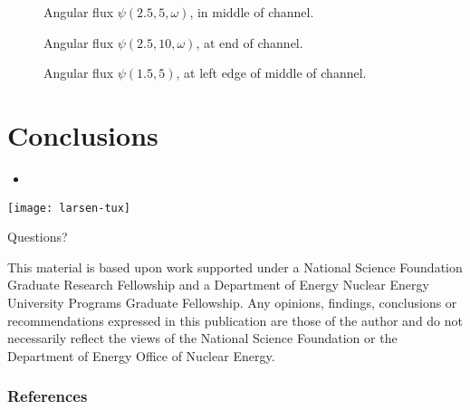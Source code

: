 \documentclass{beamer}
\begin{document}
\begin{frame}
\begin{figure}[tb]
  \centering
  
  \caption{Angular flux $\psi(2.5,5,\omega)$, in middle of channel.}
  \label{fig:psi5}
\end{figure}
\end{frame}

\begin{frame}
\begin{figure}[tb]
  \centering
  
  \caption{Angular flux $\psi(2.5,10,\omega)$, at end of channel.}
  \label{fig:psi10}
\end{figure}
\end{frame}

\begin{frame}
\begin{figure}[tb]
  \centering
  
  \caption{Angular flux $\psi(1.5,5)$, at left edge of middle of channel.}
  \label{fig:psiEdge}
\end{figure}
\end{frame}

\section{Conclusions}
\begin{frame}
\begin{itemize}
  \item 
\end{itemize}
\end{frame}

\appendix
\begin{frame}

{\par\centering\hspace{-.35in}
  \texttt{[image: larsen-tux]}
  \par}

\vspace{-3in}
{\par\Huge Questions?
\par}%
\vspace{3in}

{\vspace{-.25in}%
\setlength{\baselineskip}{-\baselineskip} \tiny %
This material is based upon work supported under a National Science Foundation
Graduate Research Fellowship and a Department of Energy Nuclear Energy
University Programs Graduate Fellowship. Any opinions, findings, conclusions or
recommendations expressed in this publication are those of the author and do
not necessarily reflect the views of the National Science Foundation or the
Department of Energy Office of Nuclear Energy.\par}

\end{frame}

\begin{frame}
  \frametitle{References}


\end{frame}
\end{document}
